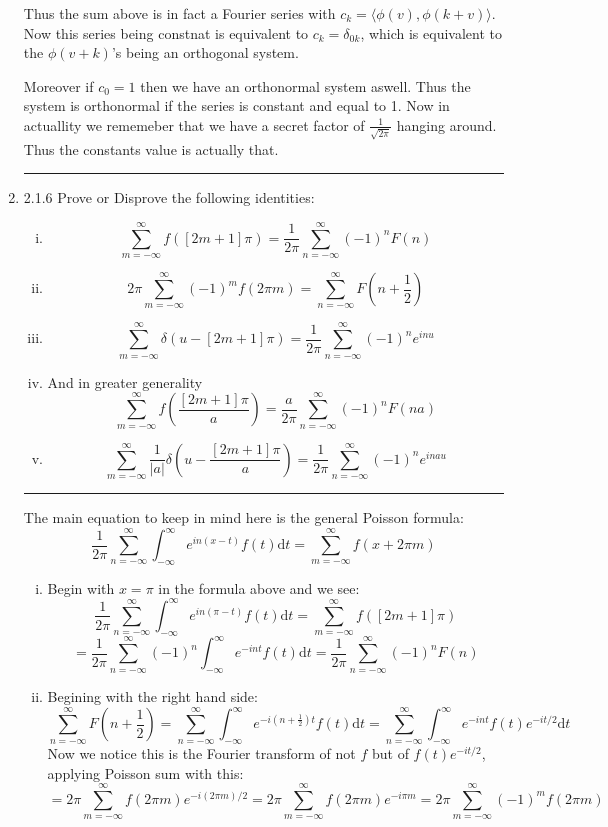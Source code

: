\documentclass[12pt]{article}
\newcommand{\di}{\mathrm{d}}
\newcommand{\intinf}{\int_{-\infty}^\infty}
\newcommand{\suminf}[1]{\sum_{#1 = -\infty}^\infty}
\theoremstyle{definition}
\begin{document}
\begin{enumerate}
Thus the sum above is in fact a Fourier series with $c_k = 
\langle \phi (v) , \phi (k+v) \rangle $.
Now this series being constnat is equivalent to $c_k = \delta_{0k}$, which is equivalent to the $\phi(v+k)$'s being an orthogonal system.

Moreover if $c_0 =1$ then we have an orthonormal system aswell. Thus the system is orthonormal if the series is constant and equal to 1.
Now in actuallity we rememeber that we have a secret factor of $\frac 1 { \sqrt{ 2 \pi} }$ hanging around. Thus the constants value is actually that.


\hrule
\item 2.1.6
Prove or Disprove the following identities:
\begin{enumerate}[i)]
\item
		\[
	\suminf{m} f( [2m+1] \pi) = \frac 1 {2\pi} \suminf{n} (-1)^n F(n)
		\]
\item
		\[
		2 \pi \suminf{m} (-1)^m f( 2\pi m) = \suminf{n} F(n + \frac 1 2)
		\]
\item
		\[
			\suminf{m} \delta(u- [2m+1] \pi) = \frac 1 {2\pi} \suminf{n} (-1)^n e^{inu}
		\]
\item
	And in greater generality 
		\[
	\suminf{m} f(\frac{ [2m+1] \pi} {a} ) =
		\frac a {2\pi} \suminf{n} (-1)^n F(na)
		\]
\item
		\[
	\suminf{m} \frac 1 {|a|} \delta(u- \frac{[2m+1] \pi} {a}) = \frac 1 {2\pi} \suminf{n} (-1)^n e^{inau}
		\]
\end{enumerate}

\hrule
The main equation to keep in mind here is the general Poisson formula:
\[
	\frac 1 {2 \pi} \suminf{n} \intinf e^{in(x-t)} f(t) \di t = \suminf{m} f(x+ 2 \pi m)
\]
\begin{enumerate}[i)]
	\item
		Begin with $x=\pi$ in the formula above and we see:
\[
	\frac 1 {2 \pi} \suminf{n} \intinf e^{in(\pi -t)} f(t) \di t = \suminf{m} f([2 m+1]\pi )
\]
\[
=	\frac 1 {2 \pi} \suminf{n} (-1)^n \intinf e^{-int} f(t) \di t
		=	\frac 1 {2 \pi} \suminf{n} (-1)^n F(n)
	\]



	\item
		Begining with the right hand side:
		\[
			\suminf{n} F(n + \frac 1 2) 
	= \suminf{n} \intinf e^{-i(n+\frac 1 2) t} f(t) \di t
	= \suminf{n} \intinf e^{-in t} f(t)e^{-i t/2} \di t
		\]
		Now we notice this is the Fourier transform of not $f$ but of $f(t) e^{-i t/2}$, applying Poisson sum with this:
		\[
			= 2\pi \suminf{m} f(2 \pi m) e^{-i (2 \pi m)/2}
			= 2\pi \suminf{m} f(2 \pi m) e^{-i \pi m}
		=2 \pi \suminf{m} (-1)^m f( 2\pi m) 
		\]


\end{enumerate}
\end{enumerate}
\end{document}
